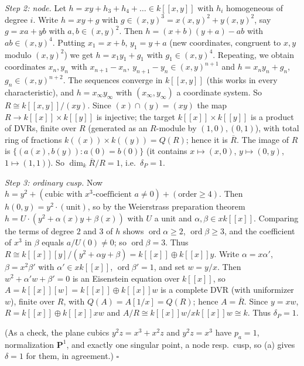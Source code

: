 \documentclass[11pt]{article}
\begin{document}
\emph{Step 2: node.} Let $h=xy+h_3+h_4+\dots\in k[[x,y]]$ with $h_i$ homogeneous of degree $i$. Write $h=xy+g$ with $g\in(x,y)^3=x(x,y)^2+y(x,y)^2$, say $g=xa+yb$ with $a,b\in(x,y)^2$. Then $h=(x+b)(y+a)-ab$ with $ab\in(x,y)^4$. Putting $x_1=x+b$, $y_1=y+a$ (new coordinates, congruent to $x,y$ modulo $(x,y)^2$) we get $h=x_1y_1+g_1$ with $g_1\in(x,y)^4$. Repeating, we obtain coordinates $x_n,y_n$ with $x_{n+1}-x_n,\ y_{n+1}-y_n\in(x,y)^{n+1}$ and $h=x_ny_n+g_n$, $g_n\in(x,y)^{n+2}$. The sequences converge in $k[[x,y]]$ (this works in every characteristic), and $h=x_\infty y_\infty$ with $(x_\infty,y_\infty)$ a coordinate system. So $R\cong k[[x,y]]/(xy)$. Since $(x)\cap(y)=(xy)$ the map $R\to k[[x]]\times k[[y]]$ is injective; the target $k[[x]]\times k[[y]]$ is a product of DVRs, finite over $R$ (generated as an $R$-module by $(1,0),(0,1)$), with total ring of fractions $k((x))\times k((y))=Q(R)$; hence it is $\overline R$. The image of $R$ is $\{(a(x),b(y)):a(0)=b(0)\}$ (it contains $x\mapsto(x,0)$, $y\mapsto(0,y)$, $1\mapsto(1,1)$). So $\dim_k\overline R/R=1$, i.e.\ $\delta_P=1$.

\emph{Step 3: ordinary cusp.} Now $h=y^2+(\text{cubic with }x^3\text{-coefficient }a\ne0)+(\text{order}\ge4)$. Then $h(0,y)=y^2\cdot(\text{unit})$, so by the Weierstrass preparation theorem $h=U\cdot(y^2+\alpha(x)y+\beta(x))$ with $U$ a unit and $\alpha,\beta\in xk[[x]]$. Comparing the terms of degree $2$ and $3$ of $h$ shows $\operatorname{ord}\alpha\ge2$, $\operatorname{ord}\beta\ge3$, and the coefficient of $x^3$ in $\beta$ equals $a/U(0)\ne0$; so $\operatorname{ord}\beta=3$. Thus $R\cong k[[x]][y]/(y^2+\alpha y+\beta)=k[[x]]\oplus k[[x]]y$. Write $\alpha=x\alpha'$, $\beta=x^2\beta'$ with $\alpha'\in xk[[x]]$, $\operatorname{ord}\beta'=1$, and set $w=y/x$. Then $w^2+\alpha'w+\beta'=0$ is an Eisenstein equation over $k[[x]]$, so $A=k[[x]][w]=k[[x]]\oplus k[[x]]w$ is a complete DVR (with uniformizer $w$), finite over $R$, with $Q(A)=A[1/x]=Q(R)$; hence $A=\overline R$. Since $y=xw$, $R=k[[x]]\oplus k[[x]]xw$ and $A/R\cong k[[x]]w/xk[[x]]w\cong k$. Thus $\delta_P=1$.

(As a check, the plane cubics $y^2z=x^3+x^2z$ and $y^2z=x^3$ have $p_a=1$, normalization $\mathbf P^1$, and exactly one singular point, a node resp.\ cusp, so (a) gives $\delta=1$ for them, in agreement.) \hfill$\square$
\end{document}
